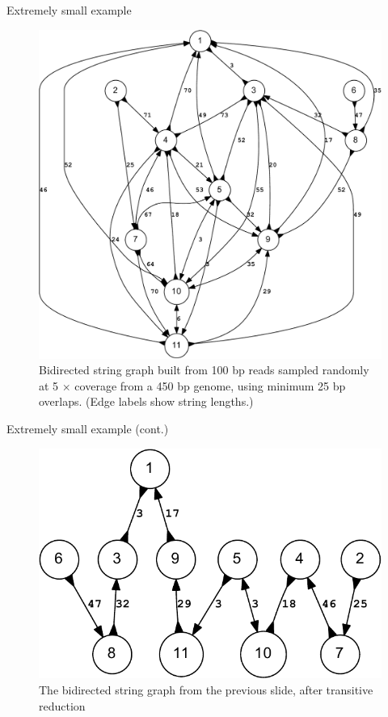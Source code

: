 \documentclass[xcolor=dvipsnames]{beamer}
\begin{document}
\begin{frame}{Extremely small example}
    \begin{figure}[H]
        \includegraphics[scale=0.25]{example.bidigraph-crop.pdf}
        \caption{Bidirected string graph built from 100 bp reads sampled
        randomly at 5 $\times$ coverage from a 450 bp genome, using minimum 25
        bp overlaps.  (Edge labels show string lengths.) }
    \end{figure}
\end{frame}

\begin{frame}{Extremely small example (cont.)}
    \begin{figure}[H]
        \includegraphics[scale=0.7]{example.reduced.mapped.bidigraph-crop.pdf}
        \caption{The bidirected string graph from the previous slide, after
        transitive reduction}
    \end{figure}
\end{frame}
\end{document}
